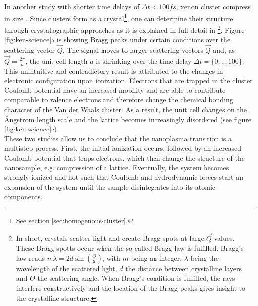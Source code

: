 In another study with shorter time delays of $\Delta t<100 fs$, xenon cluster compress in size \citep{Ferguson-2016-SciAdv}. Since clusters form as a crystal\footnote{See section \ref{sec:homogenous-cluster}.}, one can determine their structure through crystallographic approaches as it is explained in full detail in \citep[][chapter 5]{Als-Nielson-2011-JWS}\footnote{In short, crystals scatter light and create Bragg spots at large $\vec{Q}$-values. These Bragg spotts occur when the so called Bragg-law is fulfilled. Bragg's law reads $m \lambda = 2d \sin\left(\frac{\Theta}{2}\right)$, with $m$ being an integer, $\lambda$ being the wavelength of the scattered light, $d$ the distance between crystalline layers and $\Theta$ the scattering angle. When Bragg's condition is fulfilled, the rays interfere constructively and the location of the Bragg peaks gives insight to the crystalline structure.}. Figure \ref{fig:ken-science}a is showing Bragg peaks under certain conditions over the scattering vector $\vec{Q}$. The signal moves to larger scattering vectors $\vec{Q}$ and, as $\vec{Q}=\frac{2\pi}{a}$, the unit cell length $a$ is shrinking over the time delay $\Delta t = \{0,..,100\}$. This unintuitive and contradictory result is attributed to the changes in electronic configuration upon ionization. Electrons that are trapped in the cluster Coulomb potential have an increased mobility and are able to contribute comparable to valence electrons and therefore change the chemical bonding character of the Van der Waals cluster. As a result, the unit cell changes on the {\AA}ngstrom length scale and the lattice becomes increasingly disordered (see figure \ref{fig:ken-science}c).\\
These two studies allow us to conclude that the nanoplasma transition is a multistep process. First, the initial ionization occurs, followed by an increased Coulomb potential that traps electrons, which then change the structure of the nanosample, e.g. compression of a lattice. Eventually, the system becomes strongly ionized and hot such that Coulomb and hydrodynamic forces start an expansion of the system until the sample disintegrates into its atomic components.
%
%
%
